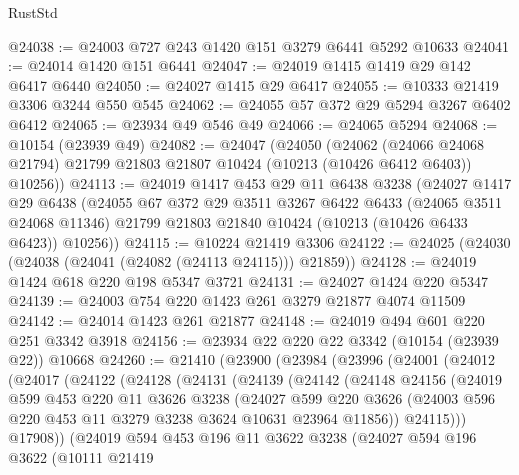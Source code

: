 \begin{lexlean}{RustStd}
\begin{coremodule}
@24038 := @24003 @727 @243 @1420 @151 @3279 @6441 @5292 @10633
@24041 := @24014 @1420 @151 @6441
@24047 := @24019 @1415 @1419 @29 @142 @6417 @6440
@24050 := @24027 @1415 @29 @6417
@24055 := @10333 @21419 @3306 @3244 @550 @545
@24062 := @24055 @57 @372 @29 @5294 @3267 @6402 @6412
@24065 := @23934 @49 @546 @49
@24066 := @24065 @5294
@24068 := @10154 (@23939 @49)
@24082 := @24047
    (@24050
      (@24062
        (@24066 @24068 @21794)
        @21799
        @21803
        @21807
        @10424
        (@10213 (@10426 @6412 @6403))
        @10256))
@24113 := @24019
    @1417
    @453
    @29
    @11
    @6438
    @3238
    (@24027
      @1417
      @29
      @6438
      (@24055
        @67
        @372
        @29
        @3511
        @3267
        @6422
        @6433
        (@24065 @3511 @24068 @11346)
        @21799
        @21803
        @21840
        @10424
        (@10213 (@10426 @6433 @6423))
        @10256))
@24115 := @10224 @21419 @3306
@24122 := @24025 (@24030 (@24038 (@24041 (@24082 (@24113 @24115))) @21859))
@24128 := @24019 @1424 @618 @220 @198 @5347 @3721
@24131 := @24027 @1424 @220 @5347
@24139 := @24003 @754 @220 @1423 @261 @3279 @21877 @4074 @11509
@24142 := @24014 @1423 @261 @21877
@24148 := @24019 @494 @601 @220 @251 @3342 @3918
@24156 := @23934 @22 @220 @22 @3342 (@10154 (@23939 @22)) @10668
@24260 := @21410
    (@23900
      (@23984
        (@23996
          (@24001
            (@24012
              (@24017
                (@24122
                  (@24128
                    (@24131
                      (@24139
                        (@24142
                          (@24148
                            @24156
                            (@24019
                              @599
                              @453
                              @220
                              @11
                              @3626
                              @3238
                              (@24027
                                @599
                                @220
                                @3626
                                (@24003 @596 @220 @453 @11 @3279 @3238 @3624 @10631 @23964 @11856))
                              @24115)))
                        @17908))
                    (@24019
                      @594
                      @453
                      @196
                      @11
                      @3622
                      @3238
                      (@24027
                        @594
                        @196
                        @3622
                        (@10111
                          @21419

\end{coremodule}
\end{lexlean}
